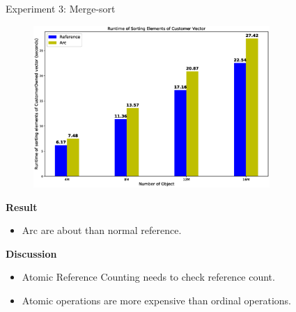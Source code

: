 \documentclass[9pt]{beamer}
\begin{document}

% 


\begin{frame}[fragile]{Experiment 3: Merge-sort}
    \vspace{-0.55cm}
    \begin{figure}[hp]
        \centering
        \begin{center}
                \includegraphics[width=0.8\textwidth]{images/rust_merge_sort.eps}
                \captionsetup{labelformat=empty}
        \end{center}
    \end{figure}
    \vspace{-0.95cm}
    \textbf{Result}
    \begin{itemize}
        \item Arc are about  than normal reference.
    \end{itemize}
    \textbf{Discussion}
    \begin{itemize}
        \item Atomic Reference Counting needs to check reference count.
        \item Atomic operations are more expensive than ordinal operations.
    \end{itemize}

\end{frame}
\end{document}
